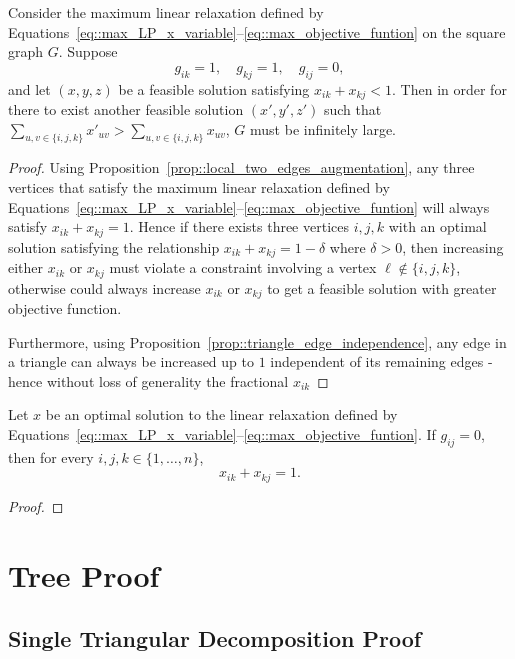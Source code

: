 \begin{proposition} \label{prop::extended_two_edges_augmentation}
  Consider the maximum linear relaxation defined by Equations~\eqref{eq::max_LP_x_variable}--\eqref{eq::max_objective_funtion} on the square graph $G$. Suppose
  \[
  g_{ik}=1,\quad g_{kj}=1,\quad g_{ij}=0,
  \]
  and let $(x,y,z)$ be a feasible solution satisfying $x_{ik}+x_{kj}<1$. Then in order for there to exist another feasible solution $(x',y',z')$ such that $ \displaystyle \sum_{u,v\in\{i,j,k\}}x'_{uv} > \sum_{u,v\in\{i,j,k\}}x_{uv}$, $G$ must be infinitely large.
\end{proposition}
\begin{proof}
  Using Proposition~\ref{prop::local_two_edges_augmentation}, any three vertices that satisfy the maximum linear relaxation defined by Equations~\eqref{eq::max_LP_x_variable}--\eqref{eq::max_objective_funtion} will always satisfy $x_{ik}+x_{kj}=1$. Hence if there exists three vertices $i,j,k$ with an optimal solution satisfying the relationship $x_{ik} + x_{kj} = 1 - \delta$ where $\delta > 0 $, then increasing either $x_{ik}$ or $x_{kj}$ must violate a constraint involving a vertex $\ell\notin\{i,j,k\}$, otherwise could always increase $x_{ik}$ or $x_{kj}$ to get a feasible solution with greater objective function. 

  Furthermore, using Proposition~\ref{prop::triangle_edge_independence}, any edge in a triangle can always be increased up to $1$ independent of its remaining edges - hence without loss of generality the fractional $x_{ik}$ 

\end{proof}


\begin{theorem} \label{theorem::two_edges_linear_maximization}
  Let $x$ be an optimal solution to the linear relaxation defined by Equations~\eqref{eq::max_LP_x_variable}--\eqref{eq::max_objective_funtion}.
  If $g_{ij}=0$, then for every $i,j,k\in\{1,\dots,n\}$,
  \[
  x_{ik}+x_{kj} = 1. 
  \]
\end{theorem}
\begin{proof}
  
\end{proof}

\section{Tree Proof} \label{sec::tree_proof}
\subsection{Single Triangular Decomposition Proof} \label{subsuc_STD_proof}

